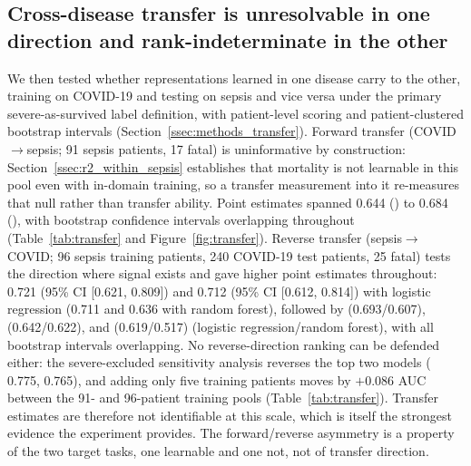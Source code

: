 \subsection{Cross-disease transfer is unresolvable in one direction and rank-indeterminate in the other}
\label{ssec:r3_cross_disease}

We then tested whether representations learned in one disease carry to the
other, training on COVID-19 and testing on sepsis and vice versa under the
primary severe-as-survived label definition, with patient-level scoring and
patient-clustered bootstrap intervals (Section~\ref{ssec:methods_transfer}).
Forward transfer (COVID$\rightarrow$sepsis; 91 sepsis patients, 17 fatal) is
uninformative by construction: Section~\ref{ssec:r2_within_sepsis} establishes
that mortality is not learnable in this pool even with in-domain training, so
a transfer measurement into it re-measures that null rather than transfer
ability. Point estimates spanned 0.644 () to 0.684
(), with bootstrap confidence intervals overlapping throughout
(Table~\ref{tab:transfer} and Figure~\ref{fig:transfer}). Reverse transfer
(sepsis$\rightarrow$COVID; 96 sepsis training patients, 240 COVID-19 test
patients, 25 fatal) tests the direction where signal exists and gave higher
point estimates throughout:  0.721 (95\% CI [0.621, 0.809]) and
 0.712 (95\% CI [0.612, 0.814]) with logistic regression
(0.711 and 0.636 with random forest), followed by  (0.693/0.607),
 (0.642/0.622), and  (0.619/0.517) (logistic
regression/random forest), with all bootstrap intervals overlapping. No
reverse-direction ranking can be defended either: the severe-excluded
sensitivity analysis reverses the top two models ( 0.775,
 0.765), and adding only five training patients moves
 by $+0.086$ AUC between the 91- and 96-patient training pools
(Table~\ref{tab:transfer}). Transfer estimates are therefore
not identifiable at this scale, which is itself the strongest evidence the
experiment provides. The forward/reverse asymmetry is a property of the two
target tasks, one learnable and one not, not of transfer direction.

